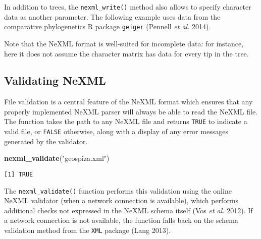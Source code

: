 \documentclass[author-year, review, 11pt]{elsarticle} %
\newenvironment{Shaded}{\begin{snugshade}}{\end{snugshade}}
\newcommand{\KeywordTok}[1]{\textcolor[rgb]{0.13,0.29,0.53}{\textbf{{#1}}}}
\newcommand{\DataTypeTok}[1]{\textcolor[rgb]{0.13,0.29,0.53}{{#1}}}
\newcommand{\StringTok}[1]{\textcolor[rgb]{0.31,0.60,0.02}{{#1}}}
\newcommand{\NormalTok}[1]{{#1}}
\begin{document}
In addition to trees, the \texttt{nexml\_write()} method also allows to
specify character data as another parameter. The following example uses
data from the comparative phylogenetics R package \texttt{geiger}
(Pennell \emph{et al.} 2014).

\begin{Shaded}
\end{Shaded}

Note that the NeXML format is well-suited for incomplete data: for
instance, here it does not assume the character matrix has data for
every tip in the tree.

\subsection{Validating NeXML}\label{validating-nexml}

File validation is a central feature of the NeXML format which ensures
that any properly implemented NeXML parser will always be able to read
the NeXML file. The function takes the path to any NeXML file and
returns \texttt{TRUE} to indicate a valid file, or \texttt{FALSE}
otherwise, along with a display of any error messages generated by the
validator.

\begin{Shaded}
\begin{Highlighting}[]
\KeywordTok{nexml_validate}\NormalTok{(}\StringTok{"geospiza.xml"}\NormalTok{)}
\end{Highlighting}
\end{Shaded}

\begin{verbatim}
[1] TRUE
\end{verbatim}

The \texttt{nexml\_validate()} function performs this validation using
the online NeXML validator (when a network connection is available),
which performs additional checks not expressed in the NeXML schema
itself (Vos \emph{et al.} 2012). If a network connection is not
available, the function falls back on the schema validation method from
the \texttt{XML} package (Lang 2013).
\end{document}
